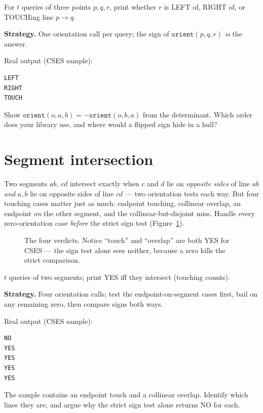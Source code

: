 \begin{example}\label{ex:loc}
For $t$ queries of three points $p,q,r$, print whether $r$ is
LEFT of, RIGHT of, or TOUCHing line $p\to q$.
\par\smallskip
\textbf{Strategy.} One orientation call per query; the sign of
$\texttt{orient}(p,q,r)$ \emph{is} the answer.
\par\smallskip
\begin{solution}

Real output (CSES sample):
\begin{lstlisting}[numbers=none]
LEFT
RIGHT
TOUCH
\end{lstlisting}
\end{solution}
\end{example}
\begin{exercise}[easy]\label{exr:signflip}
Show $\texttt{orient}(o,a,b)=-\texttt{orient}(o,b,a)$ from the
determinant. Which order does your library use, and where would
a flipped sign hide in a hull?
\end{exercise}

\section{Segment intersection}\label{sec:segint}
Two segments $ab$, $cd$ intersect exactly when $c$ and $d$ lie on
\emph{opposite sides} of line $ab$ \emph{and} $a,b$ lie on
opposite sides of line $cd$ --- two orientation tests each way.
But four touching cases matter just as much: endpoint touching,
collinear overlap, an endpoint \emph{on} the other segment, and
the collinear-but-disjoint miss. Handle every zero-orientation
case \emph{before} the strict sign test
(Figure~\ref{fig:segint}).
\begin{figure}[ht]\centering

\caption{The four verdicts. Notice ``touch'' and ``overlap'' are
both YES for CSES --- the sign test alone sees neither, because
a zero kills the strict comparison.}
\label{fig:segint}
\end{figure}

\begin{example}\label{ex:seg}
$t$ queries of two segments; print YES iff they intersect
(touching counts).
\par\smallskip
\textbf{Strategy.} Four orientation calls; test the
endpoint-on-segment cases first, bail on any remaining zero,
then compare signs both ways.
\par\smallskip
\begin{solution}

Real output (CSES sample):
\begin{lstlisting}[numbers=none]
NO
YES
YES
YES
YES
\end{lstlisting}
\end{solution}
\end{example}
\begin{exercise}[easy]\label{exr:cases}
The sample contains an endpoint touch and a collinear overlap.
Identify which lines they are, and argue why the strict sign
test alone returns NO for each.
\end{exercise}

